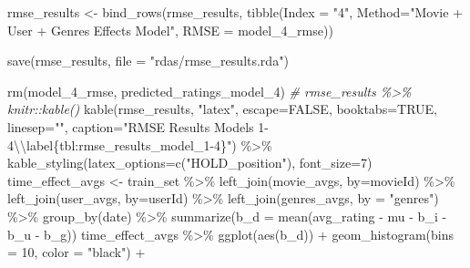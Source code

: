 \documentclass[
]{article}
\newenvironment{Shaded}{}{}
\newcommand{\AttributeTok}[1]{\textcolor[rgb]{0.49,0.56,0.16}{#1}}
\newcommand{\CommentTok}[1]{\textcolor[rgb]{0.38,0.63,0.69}{\textit{#1}}}
\newcommand{\ConstantTok}[1]{\textcolor[rgb]{0.53,0.00,0.00}{#1}}
\newcommand{\DecValTok}[1]{\textcolor[rgb]{0.25,0.63,0.44}{#1}}
\newcommand{\FunctionTok}[1]{\textcolor[rgb]{0.02,0.16,0.49}{#1}}
\newcommand{\NormalTok}[1]{#1}
\newcommand{\OtherTok}[1]{\textcolor[rgb]{0.00,0.44,0.13}{#1}}
\newcommand{\SpecialCharTok}[1]{\textcolor[rgb]{0.25,0.44,0.63}{#1}}
\newcommand{\StringTok}[1]{\textcolor[rgb]{0.25,0.44,0.63}{#1}}
\begin{document}
\begin{Shaded}
\begin{Highlighting}[]
\NormalTok{rmse\_results }\OtherTok{\textless{}{-}} \FunctionTok{bind\_rows}\NormalTok{(rmse\_results,}
                          \FunctionTok{tibble}\NormalTok{(}\AttributeTok{Index =} \StringTok{"4"}\NormalTok{, }\AttributeTok{Method=}\StringTok{"Movie + User + Genres Effects Model"}\NormalTok{,  }
                                 \AttributeTok{RMSE =}\NormalTok{ model\_4\_rmse))}

\FunctionTok{save}\NormalTok{(rmse\_results, }\AttributeTok{file =} \StringTok{"rdas/rmse\_results.rda"}\NormalTok{)}

\FunctionTok{rm}\NormalTok{(model\_4\_rmse, predicted\_ratings\_model\_4)}
\CommentTok{\# rmse\_results \%\textgreater{}\% knitr::kable()}
  \FunctionTok{kable}\NormalTok{(rmse\_results, }\StringTok{"latex"}\NormalTok{, }\AttributeTok{escape=}\ConstantTok{FALSE}\NormalTok{, }\AttributeTok{booktabs=}\ConstantTok{TRUE}\NormalTok{, }\AttributeTok{linesep=}\StringTok{""}\NormalTok{, }\AttributeTok{caption=}\StringTok{"RMSE Results Models 1{-}4}\SpecialCharTok{\textbackslash{}\textbackslash{}}\StringTok{label\{tbl:rmse\_results\_model\_1{-}4\}"}\NormalTok{) }\SpecialCharTok{\%\textgreater{}\%}
    \FunctionTok{kable\_styling}\NormalTok{(}\AttributeTok{latex\_options=}\FunctionTok{c}\NormalTok{(}\StringTok{"HOLD\_position"}\NormalTok{), }\AttributeTok{font\_size=}\DecValTok{7}\NormalTok{)}
\NormalTok{time\_effect\_avgs }\OtherTok{\textless{}{-}}\NormalTok{ train\_set }\SpecialCharTok{\%\textgreater{}\%}
  \FunctionTok{left\_join}\NormalTok{(movie\_avgs, }\AttributeTok{by=}\StringTok{\textquotesingle{}movieId\textquotesingle{}}\NormalTok{) }\SpecialCharTok{\%\textgreater{}\%}
  \FunctionTok{left\_join}\NormalTok{(user\_avgs, }\AttributeTok{by=}\StringTok{\textquotesingle{}userId\textquotesingle{}}\NormalTok{) }\SpecialCharTok{\%\textgreater{}\%} 
  \FunctionTok{left\_join}\NormalTok{(genres\_avgs, }\AttributeTok{by =} \StringTok{"genres"}\NormalTok{) }\SpecialCharTok{\%\textgreater{}\%} 
  \FunctionTok{group\_by}\NormalTok{(date) }\SpecialCharTok{\%\textgreater{}\%} 
  \FunctionTok{summarize}\NormalTok{(}\AttributeTok{b\_d =} \FunctionTok{mean}\NormalTok{(avg\_rating }\SpecialCharTok{{-}}\NormalTok{ mu }\SpecialCharTok{{-}}\NormalTok{ b\_i }\SpecialCharTok{{-}}\NormalTok{ b\_u }\SpecialCharTok{{-}}\NormalTok{ b\_g))}
\NormalTok{time\_effect\_avgs }\SpecialCharTok{\%\textgreater{}\%}  
  \FunctionTok{ggplot}\NormalTok{(}\FunctionTok{aes}\NormalTok{(b\_d)) }\SpecialCharTok{+} 
  \FunctionTok{geom\_histogram}\NormalTok{(}\AttributeTok{bins =} \DecValTok{10}\NormalTok{, }\AttributeTok{color =} \StringTok{"black"}\NormalTok{) }\SpecialCharTok{+} 

\end{Highlighting}
\end{Shaded}
\end{document}
